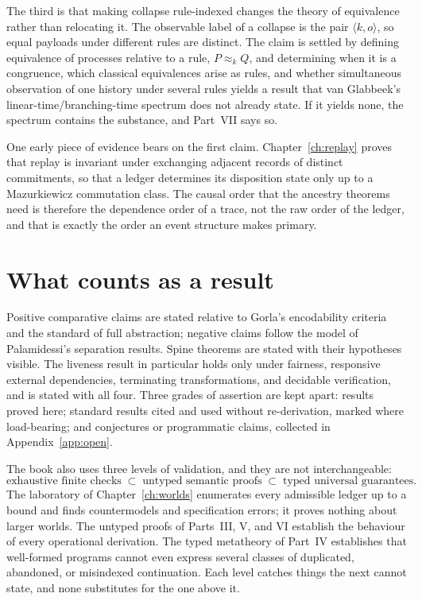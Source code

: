 \documentclass[11pt,openany]{book}
\theoremstyle{remark}
\begin{document}
The third is that making collapse rule-indexed changes the theory of
equivalence rather than relocating it. The observable label of a collapse
is the pair $\langle k,o\rangle$, so equal payloads under different rules
are distinct. The claim is settled by defining equivalence of processes
relative to a rule, $P\approx_k Q$, and determining when it is a
congruence, which classical equivalences arise as rules, and whether
simultaneous observation of one history under several rules yields a
result that van Glabbeek's linear-time/branching-time spectrum does not
already state. If it yields none, the spectrum contains the substance, and
Part~VII says so.

One early piece of evidence bears on the first claim. Chapter~\ref{ch:replay}
proves that replay is invariant under exchanging adjacent records of
distinct commitments, so that a ledger determines its disposition state
only up to a Mazurkiewicz commutation class. The causal order that the
ancestry theorems need is therefore the dependence order of a trace, not
the raw order of the ledger, and that is exactly the order an event
structure makes primary.

\section*{What counts as a result}

Positive comparative claims are stated relative to Gorla's encodability
criteria and the standard of full abstraction; negative claims follow the
model of Palamidessi's separation results. Spine theorems are stated with
their hypotheses visible. The liveness result in particular holds only
under fairness, responsive external dependencies, terminating
transformations, and decidable verification, and is stated with all four.
Three grades of assertion are kept apart: results proved here; standard
results cited and used without re-derivation, marked where load-bearing;
and conjectures or programmatic claims, collected in
Appendix~\ref{app:open}.

The book also uses three levels of validation, and they are not
interchangeable:
\[
\text{exhaustive finite checks}\;\subset\;
\text{untyped semantic proofs}\;\subset\;
\text{typed universal guarantees}.
\]
The laboratory of Chapter~\ref{ch:worlds} enumerates every admissible
ledger up to a bound and finds countermodels and specification errors; it
proves nothing about larger worlds. The untyped proofs of Parts~III, V,
and VI establish the behaviour of every operational derivation. The typed
metatheory of Part~IV establishes that well-formed programs cannot even
express several classes of duplicated, abandoned, or misindexed
continuation. Each level catches things the next cannot state, and none
substitutes for the one above it.
\end{document}
